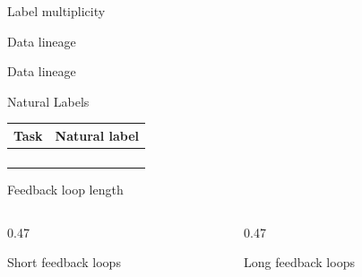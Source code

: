 \begin{frame}{Label multiplicity}
  \begin{withmargin}
    \begin{tdmain}
    \end{tdmain}
    \begin{tdmargin}
    \end{tdmargin}
  \end{withmargin}
\end{frame}

\begin{frame}{Data lineage}
  \begin{tddef}{Data lineage}
  \end{tddef}
\end{frame}

\begin{frame}{Natural Labels}
  \footnotesize
  \renewcommand{\arraystretch}{1.25}
  \begin{tabular}{@{}>{\raggedright\arraybackslash}p{}>{\raggedright\arraybackslash}p{}@{}}
    \toprule
    \textbf{Task} & \textbf{Natural label}\\
    \midrule
     & \\
     & \\
     & \\
     & \\
    \bottomrule
  \end{tabular}
\end{frame}

\begin{frame}{Feedback loop length}
  \begin{columns}[T,onlytextwidth]
    \begin{column}{0.47\textwidth}
      \begin{tdblockt}[equal height group=fbl]{Short feedback loops}
      \end{tdblockt}
    \end{column}
    \begin{column}{0.47\textwidth}
      \begin{tdblockt}[equal height group=fbl]{Long feedback loops}
      \end{tdblockt}
    \end{column}
  \end{columns}
\end{frame}

